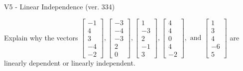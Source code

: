 \begin{exercise}
  \begin{exerciseTitle}V5 - Linear Independence (ver. 334)\end{exerciseTitle}
  \begin{exerciseStatement}
    Explain why the vectors \(\left[\begin{array}{r}
-1 \\
4 \\
3 \\
-4 \\
-2
\end{array}\right] , \left[\begin{array}{r}
-3 \\
-4 \\
-3 \\
2 \\
0
\end{array}\right] , \left[\begin{array}{r}
1 \\
-3 \\
2 \\
-1 \\
3
\end{array}\right] , \left[\begin{array}{r}
4 \\
4 \\
0 \\
4 \\
-2
\end{array}\right] , \text{ and } \left[\begin{array}{r}
1 \\
3 \\
4 \\
-6 \\
5
\end{array}\right]\) are linearly dependent or linearly independent.	



\end{exerciseStatement}
\end{exercise}
